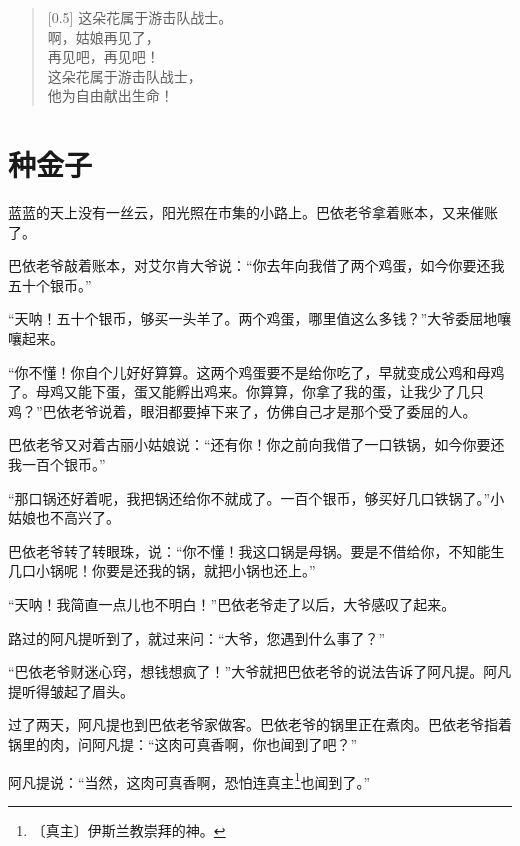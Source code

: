 \documentclass[12pt,UTF-8,openany]{ctexbook}
\begin{document}
\begin{large}
    
    \begin{verse}[0.5\linewidth]
        这朵花属于游击队战士。 \\
        啊，姑娘再见了， \\
        再见吧，再见吧！ \\
        这朵花属于游击队战士， \\
        他为自由献出生命！
    \end{verse}
    
\end{large}



\chapter{种金子}

\begin{large}
    
    蓝蓝的天上没有一丝云，阳光照在市集的小路上。巴依老爷拿着账本，又来催账了。
    
    巴依老爷敲着账本，对艾尔肯大爷说：“你去年向我借了两个鸡蛋，如今你要还我五十个银币。”
    
    “天呐！五十个银币，够买一头羊了。两个鸡蛋，哪里值这么多钱？”大爷委屈地嚷嚷起来。
    
    “你不懂！你自个儿好好算算。这两个鸡蛋要不是给你吃了，早就变成公鸡和母鸡了。母鸡又能下蛋，蛋又能孵出鸡来。你算算，你拿了我的蛋，让我少了几只鸡？”巴依老爷说着，眼泪都要掉下来了，仿佛自己才是那个受了委屈的人。
    
    巴依老爷又对着古丽小姑娘说：“还有你！你之前向我借了一口铁锅，如今你要还我一百个银币。”
    
    “那口锅还好着呢，我把锅还给你不就成了。一百个银币，够买好几口铁锅了。”小姑娘也不高兴了。
    
    巴依老爷转了转眼珠，说：“你不懂！我这口锅是母锅。要是不借给你，不知能生几口小锅呢！你要是还我的锅，就把小锅也还上。”
    
    “天呐！我简直一点儿也不明白！”巴依老爷走了以后，大爷感叹了起来。
    
    路过的阿凡提听到了，就过来问：“大爷，您遇到什么事了？”
    
    “巴依老爷财迷心窍，想钱想疯了！”大爷就把巴依老爷的说法告诉了阿凡提。阿凡提听得皱起了眉头。
    
    过了两天，阿凡提也到巴依老爷家做客。巴依老爷的锅里正在煮肉。巴依老爷指着锅里的肉，问阿凡提：“这肉可真香啊，你也闻到了吧？”
    
    阿凡提说：“当然，这肉可真香啊，恐怕连真主\footnote{〔真主〕伊斯兰教崇拜的神。}也闻到了。”
    

\end{large}
\end{document}
